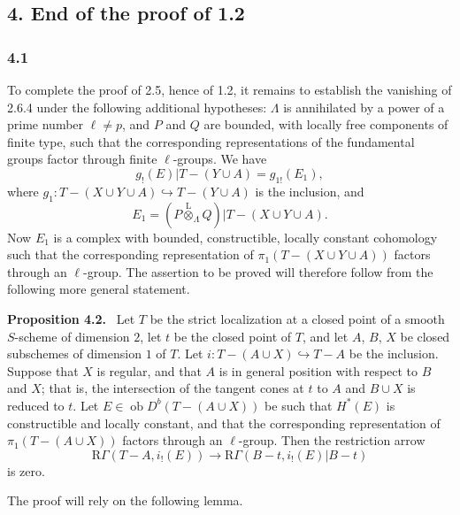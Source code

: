 \documentclass[11pt]{article}
\newenvironment{statement}[1]{\par\medskip\noindent\textbf{#1.}\ }{\par\medskip}
\providecommand{\lten}{\overset{\mathrm L}{\otimes}}
\providecommand{\Ob}{\operatorname{ob}}
\begin{document}
\subsection*{4. End of the proof of 1.2}

\subsubsection*{4.1}
To complete the proof of 2.5, hence of 1.2, it remains to establish the vanishing of 2.6.4 under the following additional hypotheses: $\Lambda$ is annihilated by a power of a prime number $\ell\ne p$, and $P$ and $Q$ are bounded, with locally free components of finite type, such that the corresponding representations of the fundamental groups factor through finite $\ell$-groups. We have
\[
g_!(E)|T-(Y\cup A)=g_{1!}(E_1),
\]
where $g_1:T-(X\cup Y\cup A)\hookrightarrow T-(Y\cup A)$ is the inclusion, and
\[
E_1=(P\lten_{\Lambda}Q)|T-(X\cup Y\cup A).
\]
Now $E_1$ is a complex with bounded, constructible, locally constant cohomology such that the corresponding representation of $\pi_1(T-(X\cup Y\cup A))$ factors through an $\ell$-group. The assertion to be proved will therefore follow from the following more general statement.

\begin{statement}{Proposition 4.2}
Let $T$ be the strict localization at a closed point of a smooth $S$-scheme of dimension $2$, let $t$ be the closed point of $T$, and let $A$, $B$, $X$ be closed subschemes of dimension $1$ of $T$. Let $i:T-(A\cup X)\hookrightarrow T-A$ be the inclusion. Suppose that $X$ is regular, and that $A$ is in general position with respect to $B$ and $X$; that is, the intersection of the tangent cones at $t$ to $A$ and $B\cup X$ is reduced to $t$. Let $E\in\Ob D^b(T-(A\cup X))$ be such that $H^*(E)$ is constructible and locally constant, and that the corresponding representation of $\pi_1(T-(A\cup X))$ factors through an $\ell$-group. Then the restriction arrow
\[
\mathrm R\Gamma(T-A,i_!(E))
\longrightarrow
\mathrm R\Gamma(B-t,i_!(E)|B-t)
\]
is zero.
\end{statement}

The proof will rely on the following lemma.
\end{document}
